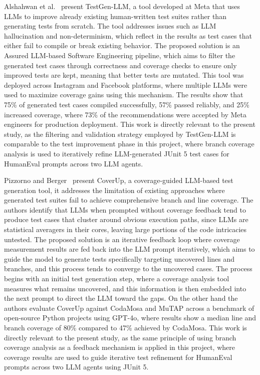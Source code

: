 \documentclass[journal]{IEEEtran}
\begin{document}
Alshahwan et al.~\cite{testgenllm} present TestGen-LLM, a tool developed at Meta that uses LLMs to improve already existing human-written test suites rather than generating tests from scratch. The tool addresses issues such as LLM hallucination and non-determinism, which reflect in the results as test cases that either fail to compile or break existing behavior. The proposed solution is an Assured LLM-based Software Engineering pipeline, which aims to filter the generated test cases through correctness and coverage checks to ensure only improved tests are kept, meaning that better tests are mutated. This tool was deployed across Instagram and Facebook platforms, where multiple LLMs were used to maximize coverage gains using this mechanism. The results show that 75\% of generated test cases compiled successfully, 57\% passed reliably, and 25\% increased coverage, where 73\% of the recommendations were accepted by Meta engineers for production deployment. This work is directly relevant to the present study, as the filtering and validation strategy employed by TestGen-LLM is comparable to the test improvement phase in this project, where branch coverage analysis is used to iteratively refine LLM-generated JUnit 5 test cases for HumanEval prompts across two LLM agents.

Pizzorno and Berger~\cite{coverup} present CoverUp, a coverage-guided LLM-based test generation tool, it addresses the limitation of existing approaches where generated test suites fail to achieve comprehensive branch and line coverage. The authors identify that LLMs when prompted without coverage feedback tend to produce test cases that cluster around obvious execution paths, since LLMs are statistical averagers in their cores, leaving large portions of the code intricacies untested. The proposed solution is an iterative feedback loop where coverage measurement results are fed back into the LLM prompt iteratively, which aims to guide the model to generate tests specifically targeting uncovered lines and branches, and this process tends to converge to the uncovered cases. The process begins with an initial test generation step, where a coverage analysis tool measures what remains uncovered, and this information is then embedded into the next prompt to direct the LLM toward the gaps. On the other hand the authors evaluate CoverUp against CodaMosa and MuTAP across a benchmark of open-source Python projects using GPT-4o, where results show a median line and branch coverage of 80\% compared to 47\% achieved by CodaMosa. This work is directly relevant to the present study, as the same principle of using branch coverage analysis as a feedback mechanism is applied in this project, where coverage results are used to guide iterative test refinement for HumanEval prompts across two LLM agents using JUnit 5.
\end{document}
